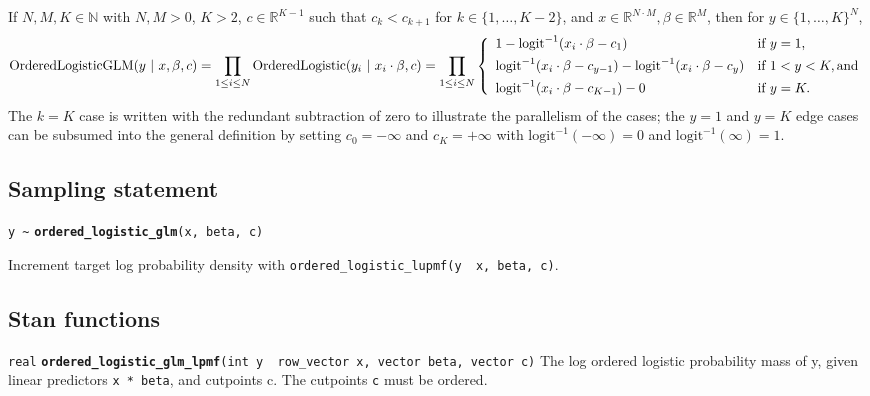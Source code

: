 \documentclass[
  10pt,
]{book}
\begin{document}
If \(N,M,K \in \mathbb{N}\) with \(N, M > 0\), \(K > 2\), \(c \in \mathbb{R}^{K-1}\) such that
\(c_k < c_{k+1}\) for \(k \in \{1,\ldots,K-2\}\), and \(x\in \mathbb{R}^{N\cdot M}, \beta\in \mathbb{R}^M\), then for \(y \in \{1,\ldots,K\}^N\),
\[\text{OrderedLogisticGLM}(y~|~x,\beta,c) = \\[4pt]
\prod_{1\leq i \leq N}\text{OrderedLogistic}(y_i~|~x_i\cdot \beta,c) = \\[17pt]
\prod_{1\leq i \leq N}\left\{ \begin{array}{ll}
1 - \text{logit}^{-1}(x_i\cdot \beta - c_1)  &  \text{if } y = 1, \\[4pt]
\text{logit}^{-1}(x_i\cdot \beta - c_{y-1}) - \text{logit}^{-1}(x_i\cdot \beta - c_{y}) & \text{if } 1 < y < K, \text{and} \\[4pt]
\text{logit}^{-1}(x_i\cdot \beta - c_{K-1}) - 0  &  \text{if } y = K.
\end{array} \right. \] The \(k=K\)
case is written with the redundant subtraction of zero to illustrate
the parallelism of the cases; the \(y=1\) and \(y=K\) edge cases can be
subsumed into the general definition by setting \(c_0 = -\infty\) and
\(c_K = +\infty\) with \(\text{logit}^{-1}(-\infty) = 0\) and
\(\text{logit}^{-1}(\infty) = 1\).

\hypertarget{sampling-statement-11}{%
\subsection{Sampling statement}\label{sampling-statement-11}}

\texttt{y\ \textasciitilde{}} \textbf{\texttt{ordered\_logistic\_glm}}\texttt{(x,\ beta,\ c)}

Increment target log probability density with \texttt{ordered\_logistic\_lupmf(y\ \textbar{}\ x,\ beta,\ c)}.

\hypertarget{stan-functions-10}{%
\subsection{Stan functions}\label{stan-functions-10}}


\texttt{real} \textbf{\texttt{ordered\_logistic\_glm\_lpmf}}\texttt{(int\ y\ \textbar{}\ row\_vector\ x,\ vector\ beta,\ vector\ c)}\newline
The log ordered logistic probability mass of y, given linear predictors \texttt{x\ *\ beta}, and cutpoints c.
The cutpoints \texttt{c} must be ordered.
\end{document}
